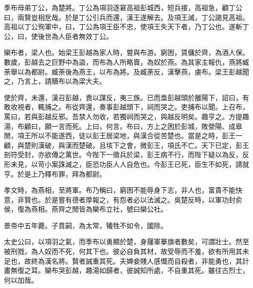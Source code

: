 季布母弟丁公，為楚將。丁公為項羽逐窘高祖彭城西，短兵接，高祖急，顧丁公曰，兩賢豈相戹哉。於是丁公引兵而還，漢王遂解去。及項王滅，丁公謁見高祖。高祖以丁公徇軍中，曰，丁公為項王臣不忠，使項王失天下者，乃丁公也。遂斬丁公，曰，使後世為人臣者無效丁公。

欒布者，梁人也。始梁王彭越為家人時，嘗與布游。窮困，賃傭於齊，為酒人保。數歲，彭越去之巨野中為盜，而布為人所略賣，為奴於燕。為其家主報仇，燕將臧荼舉以為都尉。臧荼後為燕王，以布為將。及臧荼反，漢擊燕，虜布。梁王彭越聞之，乃言上，請贖布以為梁大夫。

使於齊，未還，漢召彭越，責以謀反，夷三族。已而梟彭越頭於雒陽下，詔曰，有敢收視者，輒捕之。布從齊還，奏事彭越頭下，祠而哭之。吏捕布以聞。上召布，罵曰，若與彭越反邪。吾禁人勿收，若獨祠而哭之，與越反明矣。趣亨之。方提趣湯，布顧曰，願一言而死。上曰，何言。布曰，方上之困於彭城，敗滎陽、成皋閒，項王所以不能遂西，徒以彭王居梁地，與漢合從苦楚也。當是之時，彭王一顧，與楚則漢破，與漢而楚破。且垓下之會，微彭王，項氏不亡。天下已定，彭王剖符受封，亦欲傳之萬世。今陛下一徵兵於梁，彭王病不行，而陛下疑以為反，反形未見，以苛小案誅滅之，臣恐功臣人人自危也。今彭王已死，臣生不如死，請就亨。於是上乃釋布罪，拜為都尉。

孝文時，為燕相，至將軍。布乃稱曰，窮困不能辱身下志，非人也，富貴不能快意，非賢也。於是嘗有德者厚報之，有怨者必以法滅之。吳楚反時，以軍功封俞侯，復為燕相。燕齊之閒皆為欒布立社，號曰欒公社。

景帝中五年薨。子賁嗣，為太常，犧牲不如令，國除。

太史公曰，以項羽之氣，而季布以勇顯於楚，身屨軍搴旗者數矣，可謂壯士。然至被刑戮，為人奴而不死，何其下也。彼必自負其材，故受辱而不羞，欲有所用其未足也，故終為漢名將。賢者誠重其死。夫婢妾賤人感慨而自殺者，非能勇也，其計畫無復之耳。欒布哭彭越，趣湯如歸者，彼誠知所處，不自重其死。雖往古烈士，何以加哉。